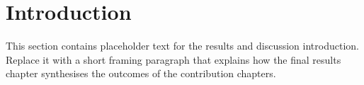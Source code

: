 \section{Introduction}
\label{sec::ResultsAndDiscussion::introduction}

This section contains placeholder text for the results and discussion introduction. Replace it with a short framing paragraph that explains how the final results chapter synthesises the outcomes of the contribution chapters.
